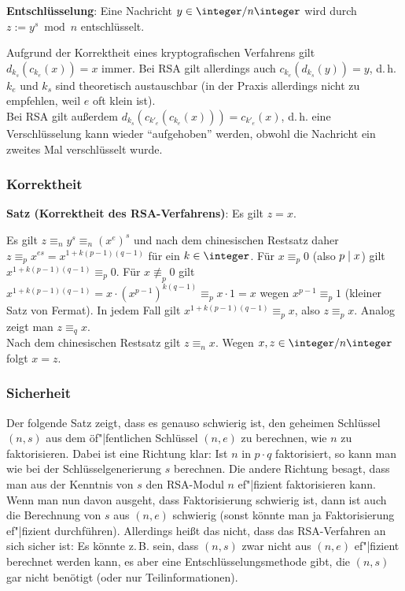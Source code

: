 \textbf{Entschlüsselung}:
Eine Nachricht $y \in \ZnZ$ wird durch $z := y^s \bmod n$ entschlüsselt.

Aufgrund der Korrektheit eines kryptografischen Verfahrens gilt $d_{k_s}(c_{k_e}(x)) = x$ immer.
Bei RSA gilt allerdings auch $c_{k_e}(d_{k_s}(y)) = y$, d.\,h.
$k_e$ und $k_s$ sind theoretisch austauschbar
(in der Praxis allerdings nicht zu empfehlen, weil $e$ oft klein ist).\\
Bei RSA gilt außerdem $d_{k_s}(c_{k'_e}(c_{k_e}(x))) = c_{k'_e}(x)$,
d.\,h. eine Verschlüsselung kann wieder "`aufgehoben"' werden, obwohl die Nachricht ein zweites
Mal verschlüsselt wurde.

\subsubsection{%
    Korrektheit%
}

\textbf{Satz (Korrektheit des RSA-Verfahrens)}:
Es gilt $z = x$.

\begin{Beweis}
    Es gilt $z \equiv_n y^s \equiv_n (x^e)^s$ und nach dem chinesischen Restsatz daher
    $z \equiv_p x^{es} = x^{1+k(p-1)(q-1)}$ für ein $k \in \integer$.
    Für $x \equiv_p 0$ (also $p \mid x$) gilt $x^{1+k(p-1)(q-1)} \equiv_p 0$.
    Für $x \not\equiv_p 0$ gilt
    $x^{1+k(p-1)(q-1)} = x \cdot (x^{p-1})^{k(q-1)} \equiv_p x \cdot 1 = x$
    wegen $x^{p-1} \equiv_p 1$ (kleiner Satz von Fermat).
    In jedem Fall gilt $x^{1+k(p-1)(q-1)} \equiv_p x$, also $z \equiv_p x$.
    Analog zeigt man $z \equiv_q x$.\\
    Nach dem chinesischen Restsatz gilt $z \equiv_n x$.
    Wegen $x, z \in \ZnZ$ folgt $x = z$.
\end{Beweis}

\pagebreak

\subsubsection{%
    Sicherheit%
}

Der folgende Satz zeigt, dass es genauso schwierig ist, den geheimen Schlüssel $(n, s)$
aus dem öf"|fentlichen Schlüssel $(n, e)$ zu berechnen, wie $n$ zu faktorisieren.
Dabei ist eine Richtung klar:
Ist $n$ in $p \cdot q$ faktorisiert, so kann man wie bei der Schlüsselgenerierung $s$ berechnen.
Die andere Richtung besagt, dass man aus der Kenntnis von $s$ den RSA-Modul $n$ ef"|fizient
faktorisieren kann.
Wenn man nun davon ausgeht, dass Faktorisierung schwierig ist, dann ist auch die Berechnung von $s$
aus $(n, e)$ schwierig (sonst könnte man ja Faktorisierung ef"|fizient durchführen).
Allerdings heißt das nicht, dass das RSA-Verfahren an sich sicher ist:
Es könnte z.\,B. sein, dass $(n, s)$ zwar nicht aus $(n, e)$ ef"|fizient berechnet werden kann,
es aber eine Entschlüsselungsmethode gibt, die $(n, s)$ gar nicht benötigt
(oder nur Teilinformationen).

